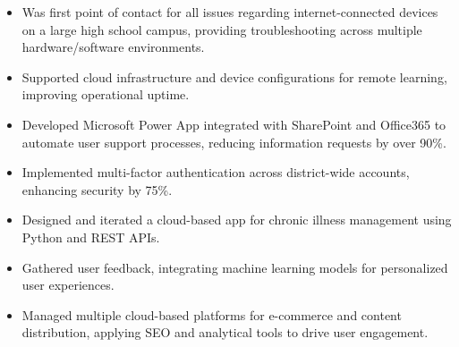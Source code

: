 

\makecvheader

\par\bigskip
{}
\par\smallskip
\begin{minipage}{13.75cm}
  \begin{minipage}{6.5cm}
    \begin{itemize}
      \item Was first point of contact for all issues regarding internet-connected devices on a large high school campus, providing troubleshooting across multiple hardware/software environments.
      \item Supported cloud infrastructure and device configurations for remote learning, improving operational uptime.
    \end{itemize}
  \end{minipage}
  \hfill
  \begin{minipage}{6.5cm}
    \begin{itemize}
      \item Developed Microsoft Power App integrated with SharePoint and Office365 to automate user support processes, reducing information requests by over 90\%.
      \item Implemented multi-factor authentication across district-wide accounts, enhancing security by 75\%.
    \end{itemize}
  \end{minipage}
\end{minipage}
\par\smallskip
\divider

\par\smallskip
\begin{minipage}{13.75cm}
  \begin{minipage}{6.5cm}
    \begin{itemize}
      \item Designed and iterated a cloud-based app for chronic illness management using Python and REST APIs.
      \item Gathered user feedback, integrating machine learning models for personalized user experiences.
    \end{itemize}
  \end{minipage}
  \hfill
  \begin{minipage}{6.5cm}
    \begin{itemize}
      \item Managed multiple cloud-based platforms for e-commerce and content distribution, applying SEO and analytical tools to drive user engagement.
    \end{itemize}
  \end{minipage}
\end{minipage}
\par\smallskip
\divider

